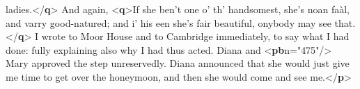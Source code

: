 \documentclass[11pt,twoside]{article}\makeatletter
\begin{document}
\begin{shaded}
\hspace*{6pt}\hspace*{6pt}\hspace*{6pt}\hspace*{6pt} ladies.{</\textbf{q}>} And again, {<\textbf{q}>}If she ben't one o' th'\mbox{}\newline 
\hspace*{6pt}\hspace*{6pt}\hspace*{6pt}\hspace*{6pt} handsomest, she's noan faàl, and varry good-natured;\mbox{}\newline 
\hspace*{6pt}\hspace*{6pt}\hspace*{6pt}\hspace*{6pt} and i' his een she's fair beautiful, onybody may see\mbox{}\newline 
\hspace*{6pt}\hspace*{6pt}\hspace*{6pt}\hspace*{6pt} that.{</\textbf{q}>}\mbox{}\newline 
{}\mbox{}\newline 
{}I wrote to Moor House and to Cambridge immediately, to\mbox{}\newline 
\hspace*{6pt}\hspace*{6pt} say what I had done: fully explaining also why I had thus\mbox{}\newline 
\hspace*{6pt}\hspace*{6pt} acted. Diana and {<\textbf{pb}\hspace*{6pt}n="{475}"/>} Mary approved the step\mbox{}\newline 
\hspace*{6pt}\hspace*{6pt} unreservedly. Diana announced that she would just give me\mbox{}\newline 
\hspace*{6pt}\hspace*{6pt} time to get over the honeymoon, and then she would come and\mbox{}\newline 
\hspace*{6pt}\hspace*{6pt} see me.{</\textbf{p}>}\mbox{}\newline 

\end{shaded}
\end{document}
